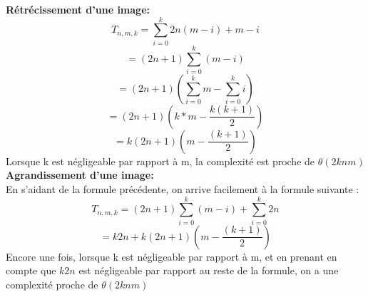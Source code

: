 \documentclass[10pt]{article}
\begin{document}
\textbf{Rétrécissement d'une image:}
$$
 	T_{n,m,k} = \sum\limits_{i=0}^{k} 2n(m-i) + m-i 
$$
$$
 	= (2n + 1)\sum\limits_{i=0}^{k} (m -i)
$$
$$
 	= (2n + 1)(\sum\limits_{i=0}^{k} m - \sum\limits_{i=0}^{k} i)
$$
$$
 	= (2n + 1)(k*m - \frac{k(k+1)}{2})
$$
$$
 	= k(2n + 1)(m - \frac{(k+1)}{2})
$$
Lorsque k est négligeable par rapport à m, la complexité est proche de $\theta(2knm)$\\
\textbf{Agrandissement d'une image:} \\
En s'aidant de la formule précédente, on arrive facilement à la formule suivante :
$$
 	T_{n,m,k} = (2n + 1)\sum\limits_{i=0}^{k} (m -i) + \sum\limits_{i=0}^{k} 2n
$$
$$
 	= k2n + k(2n + 1)(m - \frac{(k+1)}{2})
$$
Encore une fois, lorsque k est négligeable par rapport à m, et en prenant en compte que $k2n$ est négligeable par rapport au reste de la formule, on a une complexité proche de $\theta(2knm)$ 
 
\end{document}
